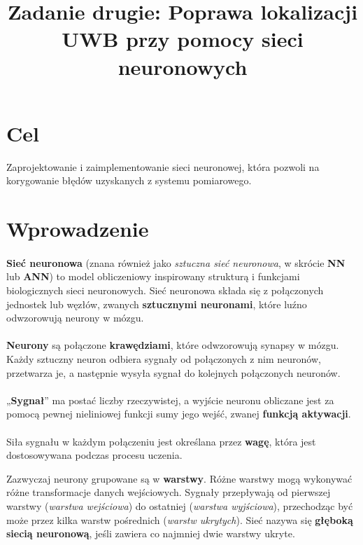 \documentclass{classrep}
\author{
  \studentinfo{Mikołaj Pawłoś}{258681} \and
  \studentinfo{Emilia Szczerba}{251643}
}
\title{Zadanie drugie: Poprawa lokalizacji UWB przy pomocy sieci neuronowych}
\begin{document}
\maketitle

\section{Cel}
 {Zaprojektowanie i zaimplementowanie sieci neuronowej,
  która pozwoli na korygowanie błędów uzyskanych z systemu pomiarowego.}


\section{Wprowadzenie}
\paragraph{}
\textbf{Sieć neuronowa} (znana również jako \textit{sztuczna sieć neuronowa},
w skrócie \textbf{NN} lub \textbf{ANN})
to model obliczeniowy inspirowany strukturą i funkcjami biologicznych sieci neuronowych.
Sieć neuronowa składa się z połączonych jednostek lub węzłów, zwanych \textbf{sztucznymi neuronami}, które luźno odwzorowują neurony w mózgu.
\paragraph{}
\textbf{Neurony} są połączone \textbf{krawędziami}, które odwzorowują synapsy w mózgu. Każdy sztuczny neuron odbiera sygnały od połączonych z nim neuronów, przetwarza je, a następnie wysyła sygnał do kolejnych połączonych neuronów.
\paragraph{}
„\textbf{Sygnał}” ma postać liczby rzeczywistej, a wyjście neuronu obliczane jest
za pomocą pewnej nieliniowej funkcji sumy jego wejść, zwanej \textbf{funkcją aktywacji}.
\paragraph{}
Siła sygnału w każdym połączeniu jest określana przez \textbf{wagę}, która jest dostosowywana podczas procesu uczenia.

Zazwyczaj neurony grupowane są w \textbf{warstwy}. Różne warstwy mogą wykonywać różne transformacje danych wejściowych.
Sygnały przepływają od pierwszej warstwy (\textit{warstwa wejściowa}) do ostatniej (\textit{warstwa wyjściowa}),
przechodząc być może przez kilka warstw pośrednich (\textit{warstw ukrytych}).
Sieć nazywa się \textbf{głęboką siecią neuronową}, jeśli zawiera co najmniej dwie warstwy ukryte.
\end{document}
